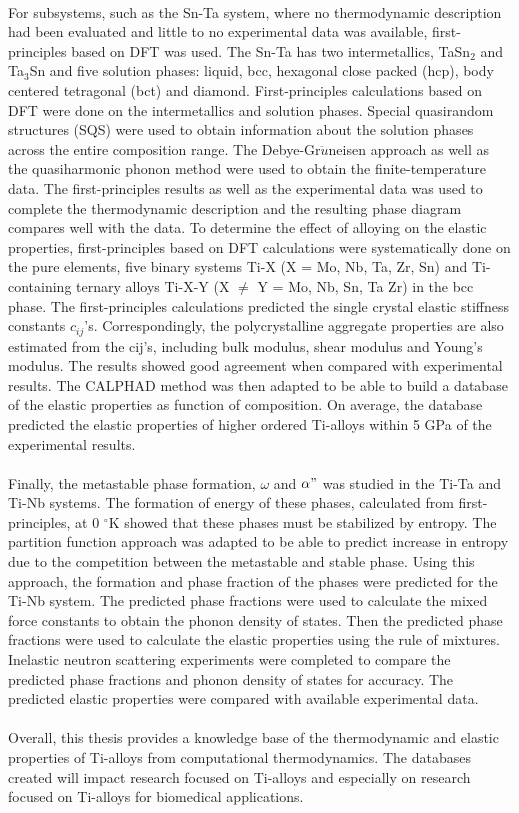 \paragraph*{} For subsystems, such as the Sn-Ta system, where no thermodynamic description had been evaluated and little to no experimental data was available, first-principles based on DFT was used. The Sn-Ta has two intermetallics, TaSn$_{2}$ and Ta$_{3}$Sn and five solution phases: liquid, bcc, hexagonal close packed (hcp), body centered tetragonal (bct) and diamond. First-principles calculations based on DFT were done on the intermetallics and solution phases. Special quasirandom structures (SQS) were used to obtain information about the solution phases across the entire composition range. The Debye-Gr$\ddot{u}$neisen approach as well as the quasiharmonic phonon method were used to obtain the finite-temperature data. The first-principles results as well as the experimental data was used to complete the thermodynamic description and the resulting phase diagram compares well with the data. To determine the effect of alloying on the elastic properties, first-principles based on DFT calculations were systematically done on the pure elements, five binary systems Ti-X (X = Mo, Nb, Ta, Zr, Sn) and Ti-containing ternary alloys Ti-X-Y (X $\neq $ Y = Mo, Nb, Sn, Ta Zr) in the bcc phase. The first-principles calculations predicted the single crystal elastic stiffness constants $c_{ij}$'s. Correspondingly, the polycrystalline aggregate properties are also estimated from the cij's, including bulk modulus, shear modulus and Young's modulus. The results showed good agreement when compared with experimental results. The CALPHAD method was then adapted to be able to build a database of the elastic properties as function of composition. On average, the database predicted the elastic properties of higher ordered Ti-alloys within 5 GPa of the experimental results.
\paragraph*{} Finally, the metastable phase formation, $\omega$ and $\alpha"$ was studied in the Ti-Ta and Ti-Nb systems. The formation of energy of these phases, calculated from first-principles, at 0 $^\circ$K showed that these phases must be stabilized by entropy. The partition function approach was adapted to be able to predict increase in entropy due to the competition between the metastable and stable phase. Using this approach, the formation and phase fraction of the phases were predicted for the Ti-Nb system. The predicted phase fractions were used to calculate the mixed force constants to obtain the phonon density of states. Then the predicted phase fractions were used to calculate the elastic properties using the rule of mixtures. Inelastic neutron scattering experiments were completed to compare the predicted phase fractions and phonon density of states for accuracy. The predicted elastic properties were compared with available experimental data.
\paragraph*{} Overall, this thesis provides a knowledge base of the thermodynamic and elastic properties of Ti-alloys from computational thermodynamics. The databases created will impact research focused on Ti-alloys and especially on research focused on Ti-alloys for biomedical applications.





